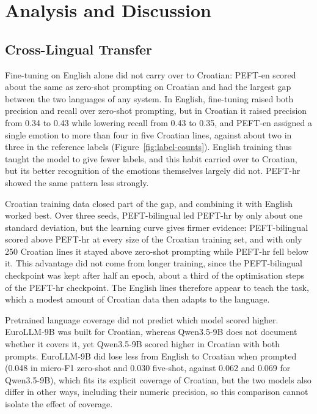 \section{Analysis and Discussion}
\label{sec:analysis}

\subsection{Cross-Lingual Transfer}
\label{sec:analysis_transfer}

Fine-tuning on English alone did not carry over to Croatian: PEFT-en scored about the same as zero-shot prompting on Croatian and had the largest gap between the two languages of any system. In English, fine-tuning raised both precision and recall over zero-shot prompting, but in Croatian it raised precision from 0.34 to 0.43 while lowering recall from 0.43 to 0.35, and PEFT-en assigned a single emotion to more than four in five Croatian lines, against about two in three in the reference labels (Figure~\ref{fig:label-counts}). English training thus taught the model to give fewer labels, and this habit carried over to Croatian, but its better recognition of the emotions themselves largely did not. PEFT-hr showed the same pattern less strongly.

Croatian training data closed part of the gap, and combining it with English worked best. Over three seeds, PEFT-bilingual led PEFT-hr by only about one standard deviation, but the learning curve gives firmer evidence: PEFT-bilingual scored above PEFT-hr at every size of the Croatian training set, and with only 250 Croatian lines it stayed above zero-shot prompting while PEFT-hr fell below it. This advantage did not come from longer training, since the PEFT-bilingual checkpoint was kept after half an epoch, about a third of the optimisation steps of the PEFT-hr checkpoint. The English lines therefore appear to teach the task, which a modest amount of Croatian data then adapts to the language.

Pretrained language coverage did not predict which model scored higher. EuroLLM-9B was built for Croatian, whereas Qwen3.5-9B does not document whether it covers it, yet Qwen3.5-9B scored higher in Croatian with both prompts. EuroLLM-9B did lose less from English to Croatian when prompted (0.048 in micro-F1 zero-shot and 0.030 five-shot, against 0.062 and 0.069 for Qwen3.5-9B), which fits its explicit coverage of Croatian, but the two models also differ in other ways, including their numeric precision, so this comparison cannot isolate the effect of coverage.

